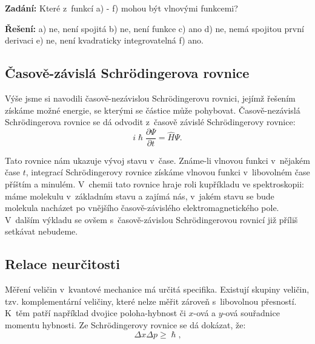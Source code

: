 \begin{priklad}
\textbf{Zadání:} Které z~funkcí a) - f) mohou být vlnovými funkcemi?

\begin{center}

\end{center}

\textbf{Řešení:} a) ne, není spojitá b) ne, není funkce c) ano d) ne, nemá spojitou první derivaci e) ne, není kvadraticky integrovatelná f) ano.
\end{priklad}

\subsection{Časově-závislá Schr\"odingerova rovnice}
Výše jsme si navodili časově-nezávislou Schr\"odingerovu rovnici, jejímž řešením získáme možné energie, se kterými se částice může pohybovat. Časově-nezávislá Schr\"odingerova rovnice se dá odvodit z~časově závislé Schr\"odingerovy rovnice:
\begin{equation}
i\hslash \frac{\partial\Psi}{\partial t} = \hat{H}\Psi \mbox{.}
\label{rov:Casovachr1}
\end{equation}

\noindent Tato rovnice nám ukazuje vývoj stavu v~čase. Známe-li vlnovou funkci v~nějakém čase $t$, integrací Schr\"odingerovy rovnice získáme vlnovou funkci v~libovolném čase příštím a minulém. V~chemii tato rovnice hraje roli kupříkladu ve spektroskopii: máme molekulu v~základním stavu a zajímá nás, v~jakém stavu se bude molekula nacházet po  vnějšího časově-závislého elektromagnetického pole. V~dalším výkladu se ovšem s~časově-závislou Schr\"odingerovou rovnicí již příliš setkávat nebudeme. 

\subsection{Relace neurčitosti}

Měření veličin v~kvantové mechanice má určitá specifika. Existují skupiny veličin, tzv. komplementární veličiny, které nelze měřit zároveň s~libovolnou přesností. K~těm patří například dvojice poloha-hybnost či $x$-ová a $y$-ová souřadnice momentu hybnosti. Ze Schr\"odingerovy rovnice se dá dokázat, že:
\begin{equation}
\Delta x \Delta p \geq \hslash\mbox{,}
\label{rov:Neurcitost1}
\end{equation}

